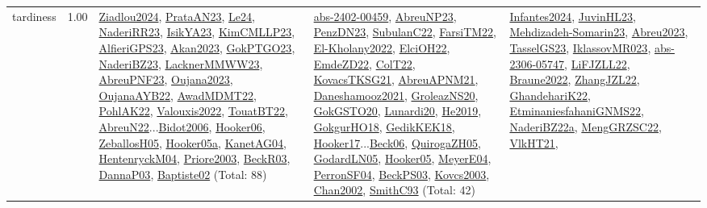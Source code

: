 {\begin{longtable}{p{3cm}r>{\raggedright\arraybackslash}p{6cm}>{\raggedright\arraybackslash}p{6cm}>{\raggedright\arraybackslash}p{8cm}}
\index{tardiness}\index{Concepts!tardiness}tardiness &  1.00 & \hyperref[detail:Ziadlou2024]{Ziadlou2024}, \hyperref[detail:PrataAN23]{PrataAN23}, \hyperref[detail:Le24]{Le24}, \hyperref[detail:NaderiRR23]{NaderiRR23}, \hyperref[detail:IsikYA23]{IsikYA23}, \hyperref[detail:KimCMLLP23]{KimCMLLP23}, \hyperref[detail:AlfieriGPS23]{AlfieriGPS23}, \hyperref[detail:Akan2023]{Akan2023}, \hyperref[detail:GokPTGO23]{GokPTGO23}, \hyperref[detail:NaderiBZ23]{NaderiBZ23}, \hyperref[detail:LacknerMMWW23]{LacknerMMWW23}, \hyperref[detail:AbreuPNF23]{AbreuPNF23}, \hyperref[detail:Oujana2023]{Oujana2023}, \hyperref[detail:OujanaAYB22]{OujanaAYB22}, \hyperref[detail:AwadMDMT22]{AwadMDMT22}, \hyperref[detail:PohlAK22]{PohlAK22}, \hyperref[detail:Valouxis2022]{Valouxis2022}, \hyperref[detail:TouatBT22]{TouatBT22}, \hyperref[detail:AbreuN22]{AbreuN22}...\hyperref[detail:Bidot2006]{Bidot2006}, \hyperref[detail:Hooker06]{Hooker06}, \hyperref[detail:ZeballosH05]{ZeballosH05}, \hyperref[detail:Hooker05a]{Hooker05a}, \hyperref[detail:KanetAG04]{KanetAG04}, \hyperref[detail:HentenryckM04]{HentenryckM04}, \hyperref[detail:Priore2003]{Priore2003}, \hyperref[detail:BeckR03]{BeckR03}, \hyperref[detail:DannaP03]{DannaP03}, \hyperref[detail:Baptiste02]{Baptiste02} (Total: 88) & \hyperref[detail:abs-2402-00459]{abs-2402-00459}, \hyperref[detail:AbreuNP23]{AbreuNP23}, \hyperref[detail:PenzDN23]{PenzDN23}, \hyperref[detail:SubulanC22]{SubulanC22}, \hyperref[detail:FarsiTM22]{FarsiTM22}, \hyperref[detail:El-Kholany2022]{El-Kholany2022}, \hyperref[detail:ElciOH22]{ElciOH22}, \hyperref[detail:EmdeZD22]{EmdeZD22}, \hyperref[detail:ColT22]{ColT22}, \hyperref[detail:KovacsTKSG21]{KovacsTKSG21}, \hyperref[detail:AbreuAPNM21]{AbreuAPNM21}, \hyperref[detail:Daneshamooz2021]{Daneshamooz2021}, \hyperref[detail:GroleazNS20]{GroleazNS20}, \hyperref[detail:GokGSTO20]{GokGSTO20}, \hyperref[detail:Lunardi20]{Lunardi20}, \hyperref[detail:He2019]{He2019}, \hyperref[detail:GokgurHO18]{GokgurHO18}, \hyperref[detail:GedikKEK18]{GedikKEK18}, \hyperref[detail:Hooker17]{Hooker17}...\hyperref[detail:Beck06]{Beck06}, \hyperref[detail:QuirogaZH05]{QuirogaZH05}, \hyperref[detail:GodardLN05]{GodardLN05}, \hyperref[detail:Hooker05]{Hooker05}, \hyperref[detail:MeyerE04]{MeyerE04}, \hyperref[detail:PerronSF04]{PerronSF04}, \hyperref[detail:BeckPS03]{BeckPS03}, \hyperref[detail:Kovcs2003]{Kovcs2003}, \hyperref[detail:Chan2002]{Chan2002}, \hyperref[detail:SmithC93]{SmithC93} (Total: 42) & \hyperref[detail:Infantes2024]{Infantes2024}, \hyperref[detail:JuvinHL23]{JuvinHL23}, \hyperref[detail:Mehdizadeh-Somarin23]{Mehdizadeh-Somarin23}, \hyperref[detail:Abreu2023]{Abreu2023}, \hyperref[detail:TasselGS23]{TasselGS23}, \hyperref[detail:IklassovMR023]{IklassovMR023}, \hyperref[detail:abs-2306-05747]{abs-2306-05747}, \hyperref[detail:LiFJZLL22]{LiFJZLL22}, \hyperref[detail:Braune2022]{Braune2022}, \hyperref[detail:ZhangJZL22]{ZhangJZL22}, \hyperref[detail:GhandehariK22]{GhandehariK22}, \hyperref[detail:EtminaniesfahaniGNMS22]{EtminaniesfahaniGNMS22}, \hyperref[detail:NaderiBZ22a]{NaderiBZ22a}, \hyperref[detail:MengGRZSC22]{MengGRZSC22}, \hyperref[detail:VlkHT21]{VlkHT21}, 
\end{longtable}}
